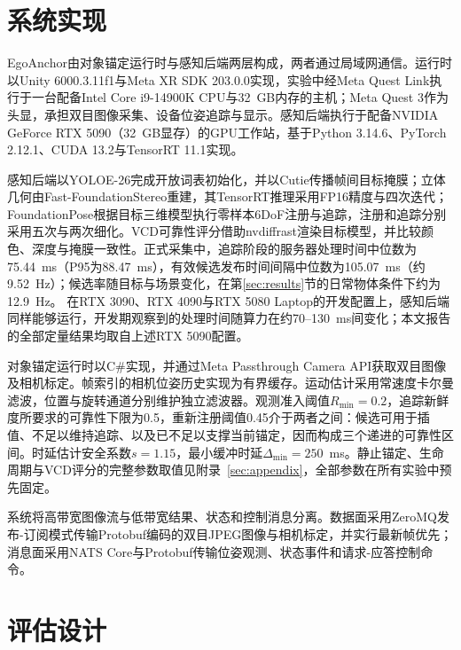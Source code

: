 \documentclass[review]{vgtc}
\begin{document}
\section{系统实现}\label{sec:implementation}

EgoAnchor由对象锚定运行时与感知后端两层构成，两者通过局域网通信。运行时以Unity 6000.3.11f1与Meta XR SDK 203.0.0实现，实验中经Meta Quest Link执行于一台配备Intel Core i9-14900K CPU与32~GB内存的主机；Meta Quest 3作为头显，承担双目图像采集、设备位姿追踪与显示。感知后端执行于配备NVIDIA GeForce RTX 5090（32~GB显存）的GPU工作站，基于Python 3.14.6、PyTorch 2.12.1、CUDA 13.2与TensorRT 11.1实现。

感知后端以YOLOE-26完成开放词表初始化，并以Cutie传播帧间目标掩膜；立体几何由Fast-FoundationStereo重建，其TensorRT推理采用FP16精度与四次迭代；FoundationPose根据目标三维模型执行零样本6DoF注册与追踪，注册和追踪分别采用五次与两次细化。VCD可靠性评分借助nvdiffrast渲染目标模型，并比较颜色、深度与掩膜一致性。正式采集中，追踪阶段的服务器处理时间中位数为75.44~ms（P95为88.47~ms），有效候选发布时间间隔中位数为105.07~ms（约9.52~Hz）；候选率随目标与场景变化，在第\ref{sec:results}节的日常物体条件下约为12.9~Hz。
在RTX 3090、RTX 4090与RTX 5080 Laptop的开发配置上，感知后端同样能够运行，开发期观察到的处理时间随算力在约70--130~ms间变化；本文报告的全部定量结果均取自上述RTX 5090配置。

对象锚定运行时以C\#实现，并通过Meta Passthrough Camera API获取双目图像及相机标定。帧索引的相机位姿历史实现为有界缓存。运动估计采用常速度卡尔曼滤波，位置与旋转通道分别维护独立滤波器。观测准入阈值$R_{\min} = 0.2$，追踪新鲜度所要求的可靠性下限为0.5，重新注册阈值0.45介于两者之间：候选可用于插值、不足以维持追踪、以及已不足以支撑当前锚定，因而构成三个递进的可靠性区间。时延估计安全系数$s = 1.15$，最小缓冲时延$\Delta_{\min} = 250$~ms。静止锚定、生命周期与VCD评分的完整参数取值见附录~\ref{sec:appendix}，全部参数在所有实验中预先固定。

系统将高带宽图像流与低带宽结果、状态和控制消息分离。数据面采用ZeroMQ发布-订阅模式传输Protobuf编码的双目JPEG图像与相机标定，并实行最新帧优先；消息面采用NATS Core与Protobuf传输位姿观测、状态事件和请求-应答控制命令。

\section{评估设计}\label{sec:evaluation}
\end{document}
